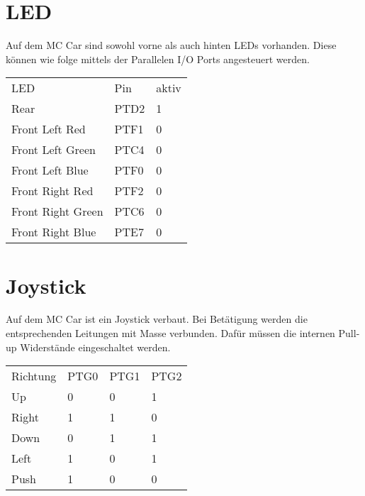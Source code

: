 \documentclass[a4paper,10pt,fleqn]{article}
\begin{document}
\section{LED}
Auf dem MC Car sind sowohl vorne als auch hinten LEDs vorhanden. Diese können 
wie folge mittels der Parallelen I/O Ports angesteuert werden. \\
\begin{table}[h!]
\begin{tabular}{lll}
\rowcolor{white} LED                 & Pin   & aktiv \\
\rowcolor{lgray} Rear                & PTD2  & 1     \\
\rowcolor{white} Front Left  Red     & PTF1  & 0     \\
\rowcolor{lgray} Front Left  Green   & PTC4  & 0     \\
\rowcolor{white} Front Left  Blue    & PTF0  & 0     \\
\rowcolor{lgray} Front Right Red     & PTF2  & 0     \\
\rowcolor{white} Front Right Green   & PTC6  & 0     \\
\rowcolor{lgray} Front Right Blue    & PTE7  & 0     \\
\end{tabular}
\end{table}

\section{Joystick}
Auf dem MC Car ist ein Joystick verbaut. Bei Betätigung werden die 
entsprechenden Leitungen mit Masse verbunden. Dafür müssen die internen 
Pull-up Widerstände eingeschaltet werden. 
\begin{table}[h!]
\begin{tabular}{llll}
\rowcolor{white} Richtung    & PTG0  & PTG1  & PTG2  \\
\rowcolor{lgray} Up          & 0     & 0     & 1     \\
\rowcolor{white} Right       & 1     & 1     & 0     \\
\rowcolor{lgray} Down        & 0     & 1     & 1     \\
\rowcolor{white} Left        & 1     & 0     & 1     \\
\rowcolor{lgray} Push        & 1     & 0     & 0     \\
\end{tabular}
\end{table}
\end{document}
